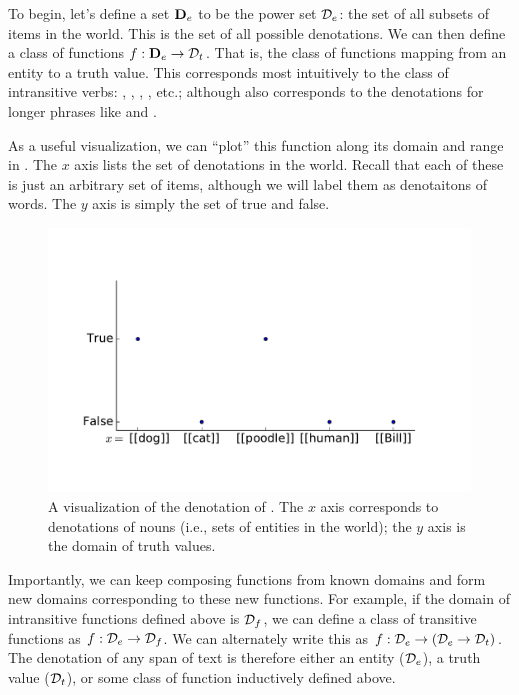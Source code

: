To begin, let's define a set $\mathbf{D}_e$ to be the power set $\mathcal{D}_e$: the set of all subsets
  of items in the world.
This is the set of all possible denotations.
We can then define a class of functions $f : \mathbf{D}_e \rightarrow \mathcal{D}_t$.
That is, the class of functions mapping from an entity to a truth value.
This corresponds most intuitively to the class of intransitive verbs: ,
  , , , etc.;
  although also corresponds to the denotations for longer phrases like 
  and .

As a useful visualization, we can ``plot'' this function
  along its domain and range in  .
The $x$ axis lists the set of denotations in the world.
Recall that each of these is just an arbitrary set of items, 
  although we will label them as denotaitons of words.
The $y$ axis is simply the set of true and false.

\begin{figure}[h]
\begin{center}
\includegraphics[height=7cm]{img/denotations_barks.pdf}
\end{center}
\caption{\label{fig:natlog-denotation-barks}
  A visualization of the denotation of . The $x$ axis corresponds to denotations
  of nouns (i.e., sets of entities in the world); the $y$ axis is the domain of truth values.
}
\end{figure}

Importantly, we can keep composing functions from known domains and form new
  domains corresponding to these new functions.
For example, if the domain of intransitive functions defined above is $\mathcal{D}_f$,
  we can define a class of transitive functions as $f : \mathcal{D}_e \rightarrow \mathcal{D}_f$.
We can alternately write this as $f : \mathcal{D}_e \rightarrow (\mathcal{D}_e \rightarrow \mathcal{D}_t)$.
The denotation of any span of text is therefore either an entity ($\mathcal{D}_e$), a truth
  value ($\mathcal{D}_t$), or some class of function inductively defined above.

